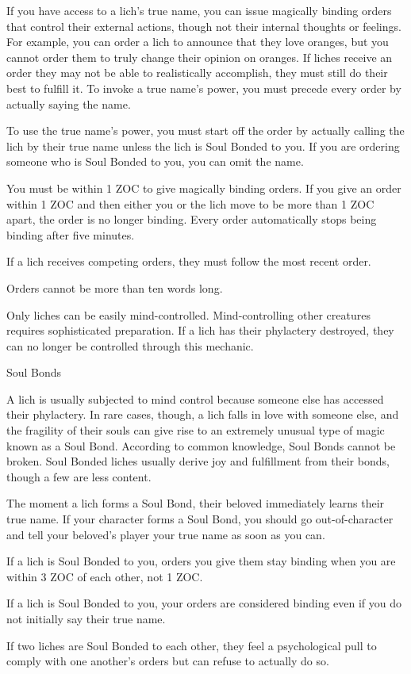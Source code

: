 \documentclass[green]{Sel}
\begin{document}
\name{\gMindControl{}}
If you have access to a lich’s true name, you can issue magically binding orders that control their external actions, though not their internal thoughts or feelings. For example, you can order a lich to announce that they love oranges, but you cannot order them to truly change their opinion on oranges. If liches receive an order they may not be able to realistically accomplish, they must still do their best to fulfill it. To invoke a true name’s power, you must precede every order by actually saying the name.

To use the true name’s power, you must start off the order by actually calling the lich by their true name unless the lich is Soul Bonded to you. If you are ordering someone who is Soul Bonded to you, you can omit the name.

You must be within 1 ZOC to give magically binding orders. If you give an order within 1 ZOC and then either you or the lich move to be more than 1 ZOC apart, the order is no longer binding. Every order automatically stops being binding after five minutes.

If a lich receives competing orders, they must follow the most recent order.

Orders cannot be more than ten words long.

Only liches can be easily mind-controlled. Mind-controlling other creatures requires sophisticated preparation. If a lich has their phylactery destroyed, they can no longer be controlled through this mechanic.

Soul Bonds

A lich is usually subjected to mind control because someone else has accessed their phylactery. In rare cases, though, a lich falls in love with someone else, and the fragility of their souls can give rise to an extremely unusual type of magic known as a Soul Bond. According to common knowledge, Soul Bonds cannot be broken. Soul Bonded liches usually derive joy and fulfillment from their bonds, though a few are less content.

The moment a lich forms a Soul Bond, their beloved immediately learns their true name. If your character forms a Soul Bond, you should go out-of-character and tell your beloved’s player your true name as soon as you can.

If a lich is Soul Bonded to you, orders you give them stay binding when you are within 3 ZOC of each other, not 1 ZOC.

If a lich is Soul Bonded to you, your orders are considered binding even if you do not initially say their true name.

If two liches are Soul Bonded to each other, they feel a psychological pull to comply with one another’s orders but can refuse to actually do so.
\end{document}
